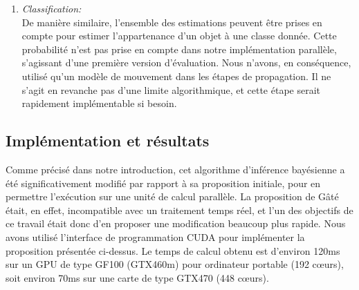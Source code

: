 \begin{enumerate}
	\item{\emph{Classification:\\}}
	De manière similaire, l'ensemble des estimations peuvent être prises en compte pour estimer l'appartenance d'un objet à une classe donnée. Cette probabilité n'est pas prise en compte dans notre implémentation parallèle, s'agissant d'une première version d'évaluation. Nous n'avons, en conséquence, utilisé qu'un modèle de mouvement dans les étapes de propagation. Il ne s'agit en revanche pas d'une limite algorithmique, et cette étape serait rapidement implémentable si besoin.
\end{enumerate}

\subsection{Implémentation et résultats}
Comme précisé dans notre introduction, cet algorithme d'inférence bayésienne a été significativement modifié par rapport à sa proposition initiale, pour en permettre l'exécution sur une unité de calcul parallèle. La proposition de Gâté était, en effet, incompatible avec un traitement temps réel, et l'un des objectifs de ce travail était donc d'en proposer une modification beaucoup plus rapide. Nous avons utilisé l'interface de programmation CUDA pour implémenter la proposition présentée ci-dessus. Le temps de calcul obtenu est d'environ 120ms sur un GPU de type GF100 (GTX460m) pour ordinateur portable (192 cœurs), soit environ 70ms sur une carte de type GTX470 (448 cœurs).

